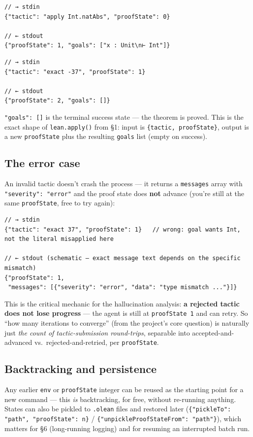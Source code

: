 \begin{verbatim}
// → stdin
{"tactic": "apply Int.natAbs", "proofState": 0}

// ← stdout
{"proofState": 1, "goals": ["x : Unit\n⊢ Int"]}
\end{verbatim}

\begin{verbatim}
// → stdin
{"tactic": "exact -37", "proofState": 1}

// ← stdout
{"proofState": 2, "goals": []}
\end{verbatim}

\texttt{"goals": []} is the terminal success state --- the theorem is proved. This is the exact shape of \texttt{lean.apply()} from \S1: input is \texttt{\{tactic, proofState\}}, output is a new \texttt{proofState} plus the resulting \texttt{goals} list (empty on success).

\subsection{The error case}

An invalid tactic doesn't crash the process --- it returns a \texttt{messages} array with \texttt{"severity": "error"} and the proof state does \textbf{not} advance (you're still at the same \texttt{proofState}, free to try again):

\begin{verbatim}
// → stdin
{"tactic": "exact 37", "proofState": 1}   // wrong: goal wants Int, not the literal misapplied here

// ← stdout (schematic — exact message text depends on the specific mismatch)
{"proofState": 1,
 "messages": [{"severity": "error", "data": "type mismatch ..."}]}
\end{verbatim}

This is the critical mechanic for the hallucination analysis: \textbf{a rejected tactic does not lose progress} --- the agent is still at \texttt{proofState 1} and can retry. So ``how many iterations to converge'' (from the project's core question) is naturally just \emph{the count of tactic-submission round-trips}, separable into accepted-and-advanced vs.\ rejected-and-retried, per \texttt{proofState}.

\subsection{Backtracking and persistence}

Any earlier \texttt{env} or \texttt{proofState} integer can be reused as the starting point for a new command --- this \emph{is} backtracking, for free, without re-running anything. States can also be pickled to \texttt{.olean} files and restored later (\texttt{\{"pickleTo": "path", "proofState": n\}} / \texttt{\{"unpickleProofStateFrom": "path"\}}), which matters for \S6 (long-running logging) and for resuming an interrupted batch run.


